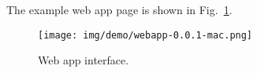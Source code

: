 The example web app page is shown in Fig.~\ref{d:fig:web_app_demo}.
\begin{figure}[htbp]
  \centering
  \texttt{[image: img/demo/webapp-0.0.1-mac.png]}
  \caption{Web app interface.}
  \label{d:fig:web_app_demo}
\end{figure}
